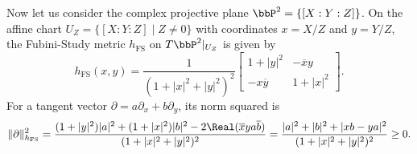 \begin{example}
\end{example}

\begin{example}\label{eg:Fubini-Study_metric_on_P^2}
	Now let us consider the complex projective plane \(\bbP^2 = \{[X:Y:Z]\}\).
	On the affine chart \(U_Z = \{[X:Y:Z] \mid Z \neq 0\}\) with coordinates \(x = X/Z\) and \(y = Y/Z\),
	the Fubini-Study metric \(h_{\text{FS}}\) on \(T \bbP^2|_{U_Z}\) is given by
	\[ h_{\text{FS}}(x,y) = \frac{1}{(1 + |x|^2 + |y|^2)^2}\begin{bmatrix}
			1 + |y|^2       & -\overline{x} y \\
			-x \overline{y} & 1 + |x|^2
		\end{bmatrix}. \]
	For a tangent vector \(\partial = a \partial_x + b \partial_y\), its norm squared is
	\[ \|\partial\|_{h_{\text{FS}}}^2 = \frac{(1 + |y|^2)|a|^2 + (1 + |x|^2)|b|^2 - 2 \Real(\overline{x} y a \overline{b})}{(1 + |x|^2 + |y|^2)^2} = \frac{|a|^2 + |b|^2 + |x b - y a|^2}{(1 + |x|^2 + |y|^2)^2} \geq 0. \]
\end{example}

